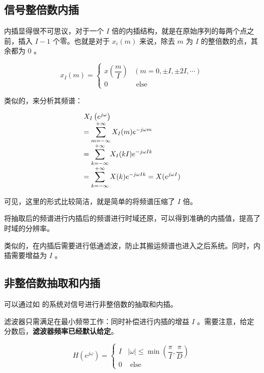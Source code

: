 \documentclass[cn,11pt,chinese,black,simple]{elegantbook}
\begin{document}
\subsection{信号整倍数内插}

内插显得很不可思议，对于一个 \(I\) 倍的内插结构，就是在原始序列的每两个点之前，插入 \(I-1\) 个零。也就是对于 \(x_i(m)\) 来说，除去 \(m\) 为 \(I\) 的整倍数的点，其余都为 \(0\) 。


\[x_{I}(m)=\left\{\begin{array}{cc}
    x\left(\dfrac{m}{I}\right) & (m=0, \pm I, \pm 2 I, \cdots) \\
    0 & \text { else }
\end{array}\right.\]

类似的，来分析其频谱：

\[
\begin{array}{l}
X_{I}\left(e^{j \omega}\right) \\
=\displaystyle\sum_{m=-\infty}^{+\infty} X_{I}(m) e^{-j \omega m} \\
=\displaystyle\sum_{k=-\infty}^{+\infty} X_{I}(k I) e^{-j \omega I k} \\
=\displaystyle\sum_{k=-\infty}^{+\infty} X(k) e^{-j \omega I k}= X(e^{j\omega I})
\end{array}
\]

可见，这里的形式比较简洁，就是简单的将频谱压缩了 \(I\) 倍。

将抽取后的频谱进行内插后的频谱进行时域还原，可以得到准确的内插值，提高了时域的分辨率。

类似的，在内插后需要进行低通滤波，防止其搬运频谱也进入之后系统。同时，内插需要增益为 \(I\) 。



\subsection{非整倍数抽取和内插}

可以通过如  的系统对信号进行非整倍数的抽取和内插。


滤波器只需满足在最小频带工作：同时补偿进行内插的增益 \(I\) 。需要注意，给定分数后，\textbf{滤波器频率已经默认给定}。

\[
H\left(e^{j \omega}\right)=\left\{\begin{array}{ll}
I & |\omega| \leq \min \left(\dfrac{\pi}{I}, \dfrac{\pi}{D}\right) \\
0 & \text { else }
\end{array}\right.
\]
\end{document}
